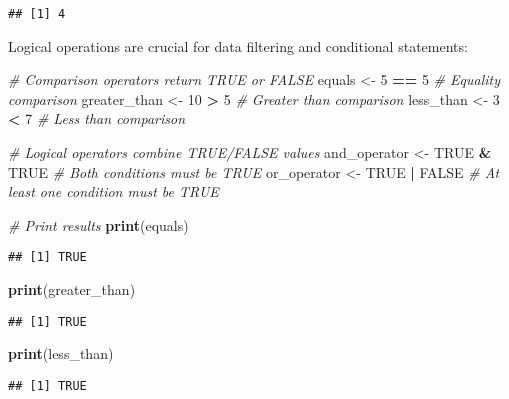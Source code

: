 \documentclass[
]{book}
\newenvironment{Shaded}{\begin{snugshade}}{\end{snugshade}}
\newcommand{\CommentTok}[1]{\textcolor[rgb]{0.56,0.35,0.01}{\textit{#1}}}
\newcommand{\ConstantTok}[1]{\textcolor[rgb]{0.56,0.35,0.01}{#1}}
\newcommand{\DecValTok}[1]{\textcolor[rgb]{0.00,0.00,0.81}{#1}}
\newcommand{\FunctionTok}[1]{\textcolor[rgb]{0.13,0.29,0.53}{\textbf{#1}}}
\newcommand{\NormalTok}[1]{#1}
\newcommand{\OtherTok}[1]{\textcolor[rgb]{0.56,0.35,0.01}{#1}}
\newcommand{\SpecialCharTok}[1]{\textcolor[rgb]{0.81,0.36,0.00}{\textbf{#1}}}
\begin{document}
\begin{verbatim}
## [1] 4
\end{verbatim}

Logical operations are crucial for data filtering and conditional statements:

\begin{Shaded}
\begin{Highlighting}[]
\CommentTok{\# Comparison operators return TRUE or FALSE}
\NormalTok{equals }\OtherTok{\textless{}{-}} \DecValTok{5} \SpecialCharTok{==} \DecValTok{5}        \CommentTok{\# Equality comparison}
\NormalTok{greater\_than }\OtherTok{\textless{}{-}} \DecValTok{10} \SpecialCharTok{\textgreater{}} \DecValTok{5}  \CommentTok{\# Greater than comparison}
\NormalTok{less\_than }\OtherTok{\textless{}{-}} \DecValTok{3} \SpecialCharTok{\textless{}} \DecValTok{7}     \CommentTok{\# Less than comparison}

\CommentTok{\# Logical operators combine TRUE/FALSE values}
\NormalTok{and\_operator }\OtherTok{\textless{}{-}} \ConstantTok{TRUE} \SpecialCharTok{\&} \ConstantTok{TRUE}    \CommentTok{\# Both conditions must be TRUE}
\NormalTok{or\_operator }\OtherTok{\textless{}{-}} \ConstantTok{TRUE} \SpecialCharTok{|} \ConstantTok{FALSE}    \CommentTok{\# At least one condition must be TRUE}

\CommentTok{\# Print results}
\FunctionTok{print}\NormalTok{(equals)}
\end{Highlighting}
\end{Shaded}

\begin{verbatim}
## [1] TRUE
\end{verbatim}

\begin{Shaded}
\begin{Highlighting}[]
\FunctionTok{print}\NormalTok{(greater\_than)}
\end{Highlighting}
\end{Shaded}

\begin{verbatim}
## [1] TRUE
\end{verbatim}

\begin{Shaded}
\begin{Highlighting}[]
\FunctionTok{print}\NormalTok{(less\_than)}
\end{Highlighting}
\end{Shaded}

\begin{verbatim}
## [1] TRUE
\end{verbatim}
\end{document}
